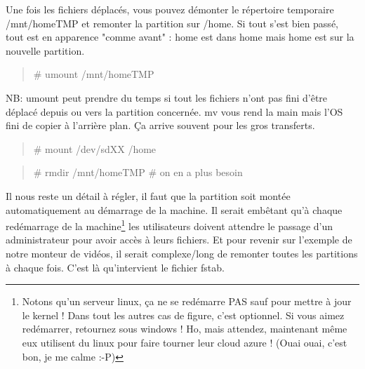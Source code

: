 \documentclass[a4paper,11pt]{article}
\newcommand{\commande}[1] {
    \begin{quote}
    \tt\raggedright #1 
    \end{quote}
}
\begin{document}
\par Une fois les fichiers déplacés, vous pouvez démonter le répertoire temporaire /mnt/homeTMP et remonter la partition sur /home. Si tout s'est bien passé, tout est en apparence "comme avant" : home est dans home mais home est sur la nouvelle partition.
\commande{\# umount /mnt/homeTMP}
\par NB: umount peut prendre du temps si tout les fichiers n'ont pas fini d'être déplacé depuis ou vers la partition concernée. mv vous rend la main mais l'OS fini de copier à l'arrière plan. Ça arrive souvent pour les gros transferts.
\commande{\# mount /dev/sdXX /home}
\commande{\# rmdir /mnt/homeTMP \# on en a plus besoin}
\par Il nous reste un détail à régler, il faut que la partition soit montée automatiquement au démarrage de la machine. Il serait embêtant qu'à chaque redémarrage de la machine\footnote{Notons qu'un serveur linux, ça ne se redémarre PAS sauf pour mettre à jour le kernel ! Dans tout les autres cas de figure, c'est optionnel. Si vous aimez redémarrer, retournez sous windows ! Ho, mais attendez, maintenant même eux utilisent du linux pour faire tourner leur cloud azure ! (Ouai ouai, c'est bon, je me calme :-P)} les utilisateurs doivent attendre le passage d'un administrateur pour avoir accès à leurs fichiers. Et pour revenir sur l'exemple de notre monteur de vidéos, il serait complexe/long de remonter toutes les partitions à chaque fois. C'est là qu'intervient le fichier fstab.
\end{document}
